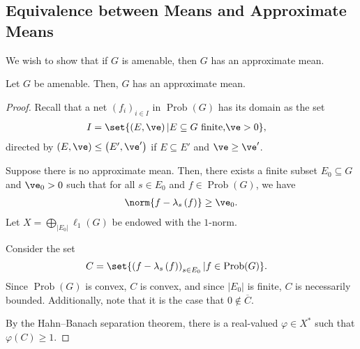 \documentclass[10pt]{mypackage}
\DeclareMathOperator{\Prob}{Prob}
\begin{document}
\subsection{Equivalence between Means and Approximate Means}%
We wish to show that if $G$ is amenable, then $G$ has an approximate mean.
\begin{theorem}
  Let $G$ be amenable. Then, $G$ has an approximate mean.
\end{theorem}
\begin{proof}
  Recall that a net $\left(f_i\right)_{i\in I}$ in $\Prob(G)$ has its domain as the set
  \begin{align*}
    I &= \set{\left(E,\ve\right) | E\subseteq G\text{ finite,} \ve > 0},
  \end{align*}
  directed by $\left(E,\ve\right) \leq \left(E',\ve'\right)$ if $E \subseteq E'$ and $\ve \geq \ve'$.\newline

  Suppose there is no approximate mean. Then, there exists a finite subset $E_0\subseteq G$ and $\ve_0 > 0$ such that for all $s\in E_0$ and $f\in \Prob(G)$, we have
  \begin{align*}
    \norm{f - \lambda_s\left(f\right)} \geq \ve_0.
  \end{align*}
  Let $X = \bigoplus_{\left\vert E_0 \right\vert}\ell_1\left(G\right)$ be endowed with the $1$-norm.\newline

  Consider the set
  \begin{align*}
    C &= \set{\left(f - \lambda_s\left(f\right)\right)_{s\in E_0} | f\in \Prob(G)}.
  \end{align*}
  Since $\Prob(G)$ is convex, $C$ is convex, and since $\left\vert E_0 \right\vert$ is finite, $C$ is necessarily bounded. Additionally, note that it is the case that $0\notin \overline{C}$.\newline

  By the Hahn--Banach separation theorem, there is a real-valued $\varphi\in X^{\ast}$ such that $\varphi\left(C\right) \geq 1$.\newline


\end{proof}
\end{document}
